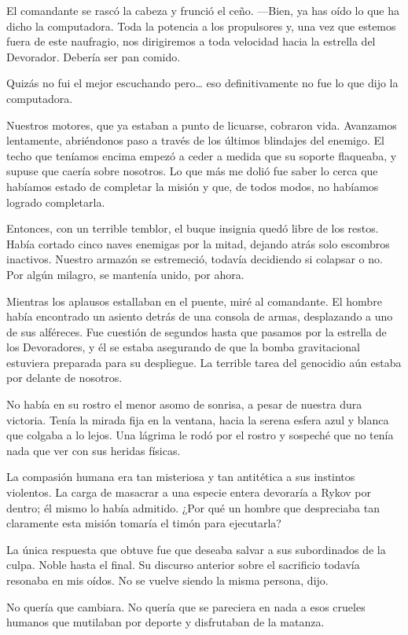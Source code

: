El comandante se rascó la cabeza y frunció el ceño. —Bien, ya has oído lo que ha dicho la computadora. Toda la potencia a los propulsores y, una vez que estemos fuera de este naufragio, nos dirigiremos a toda velocidad hacia la estrella del Devorador. Debería ser pan comido.

Quizás no fui el mejor escuchando pero… eso definitivamente no fue lo que dijo la computadora.

Nuestros motores, que ya estaban a punto de licuarse, cobraron vida. Avanzamos lentamente, abriéndonos paso a través de los últimos blindajes del enemigo. El techo que teníamos encima empezó a ceder a medida que su soporte flaqueaba, y supuse que caería sobre nosotros. Lo que más me dolió fue saber lo cerca que habíamos estado de completar la misión y que, de todos modos, no habíamos logrado completarla.

Entonces, con un terrible temblor, el buque insignia quedó libre de los restos. Había cortado cinco naves enemigas por la mitad, dejando atrás solo escombros inactivos. Nuestro armazón se estremeció, todavía decidiendo si colapsar o no. Por algún milagro, se mantenía unido, por ahora.

Mientras los aplausos estallaban en el puente, miré al comandante. El hombre había encontrado un asiento detrás de una consola de armas, desplazando a uno de sus alféreces. Fue cuestión de segundos hasta que pasamos por la estrella de los Devoradores, y él se estaba asegurando de que la bomba gravitacional estuviera preparada para su despliegue. La terrible tarea del genocidio aún estaba por delante de nosotros.

No había en su rostro el menor asomo de sonrisa, a pesar de nuestra dura victoria. Tenía la mirada fija en la ventana, hacia la serena esfera azul y blanca que colgaba a lo lejos. Una lágrima le rodó por el rostro y sospeché que no tenía nada que ver con sus heridas físicas.

La compasión humana era tan misteriosa y tan antitética a sus instintos violentos. La carga de masacrar a una especie entera devoraría a Rykov por dentro; él mismo lo había admitido. ¿Por qué un hombre que despreciaba tan claramente esta misión tomaría el timón para ejecutarla?

La única respuesta que obtuve fue que deseaba salvar a sus subordinados de la culpa. Noble hasta el final. Su discurso anterior sobre el sacrificio todavía resonaba en mis oídos. No se vuelve siendo la misma persona, dijo.

No quería que cambiara. No quería que se pareciera en nada a esos crueles humanos que mutilaban por deporte y disfrutaban de la matanza.

